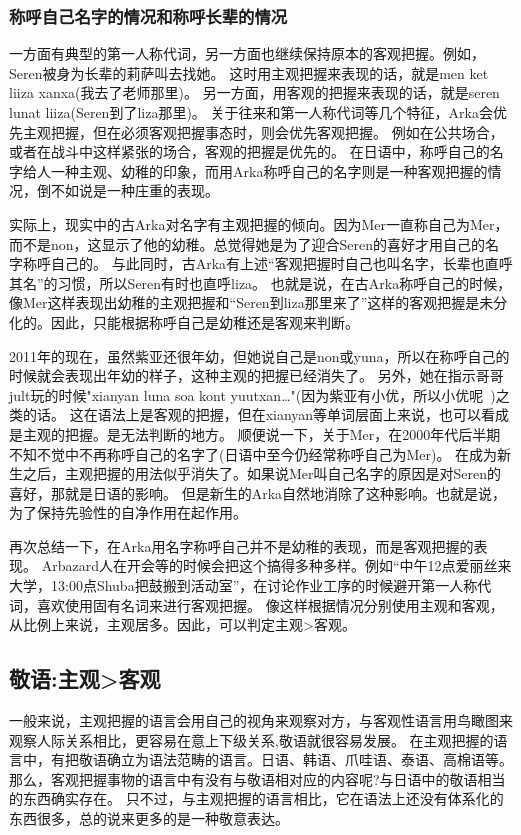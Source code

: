 \subsubsection{称呼自己名字的情况和称呼长辈的情况}

一方面有典型的第一人称代词，另一方面也继续保持原本的客观把握。例如，Seren被身为长辈的莉萨叫去找她。
这时用主观把握来表现的话，就是men ket liiza xanxa(我去了老师那里)。
另一方面，用客观的把握来表现的话，就是seren lunat liiza(Seren到了liza那里)。
关于往来和第一人称代词等几个特征，Arka会优先主观把握，但在必须客观把握事态时，则会优先客观把握。
例如在公共场合，或者在战斗中这样紧张的场合，客观的把握是优先的。
在日语中，称呼自己的名字给人一种主观、幼稚的印象，而用Arka称呼自己的名字则是一种客观把握的情况，倒不如说是一种庄重的表现。

实际上，现实中的古Arka对名字有主观把握的倾向。因为Mer一直称自己为Mer，而不是non，这显示了他的幼稚。总觉得她是为了迎合Seren的喜好才用自己的名字称呼自己的。
与此同时，古Arka有上述“客观把握时自己也叫名字，长辈也直呼其名”的习惯，所以Seren有时也直呼liza。
也就是说，在古Arka称呼自己的时候，像Mer这样表现出幼稚的主观把握和“Seren到liza那里来了”这样的客观把握是未分化的。因此，只能根据称呼自己是幼稚还是客观来判断。

2011年的现在，虽然紫亚还很年幼，但她说自己是non或yuna，所以在称呼自己的时候就会表现出年幼的样子，这种主观的把握已经消失了。
另外，她在指示哥哥jult玩的时候"xianyan luna soa kont yuutxan…"(因为紫亚有小优，所以小优呢~)之类的话。
这在语法上是客观的把握，但在xianyan等单词层面上来说，也可以看成是主观的把握。是无法判断的地方。
顺便说一下，关于Mer，在2000年代后半期不知不觉中不再称呼自己的名字了(日语中至今仍经常称呼自己为Mer)。
在成为新生之后，主观把握的用法似乎消失了。如果说Mer叫自己名字的原因是对Seren的喜好，那就是日语的影响。
但是新生的Arka自然地消除了这种影响。也就是说，为了保持先验性的自净作用在起作用。

再次总结一下，在Arka用名字称呼自己并不是幼稚的表现，而是客观把握的表现。
Arbazard人在开会等的时候会把这个搞得多种多样。例如“中午12点爱丽丝来大学，13:00点Shuba把鼓搬到活动室”，在讨论作业工序的时候避开第一人称代词，喜欢使用固有名词来进行客观把握。
像这样根据情况分别使用主观和客观，从比例上来说，主观居多。因此，可以判定主观>客观。

\subsection{敬语:主观>客观}

一般来说，主观把握的语言会用自己的视角来观察对方，与客观性语言用鸟瞰图来观察人际关系相比，更容易在意上下级关系,敬语就很容易发展。
在主观把握的语言中，有把敬语确立为语法范畴的语言。日语、韩语、爪哇语、泰语、高棉语等。
那么，客观把握事物的语言中有没有与敬语相对应的内容呢?与日语中的敬语相当的东西确实存在。
只不过，与主观把握的语言相比，它在语法上还没有体系化的东西很多，总的说来更多的是一种敬意表达。

